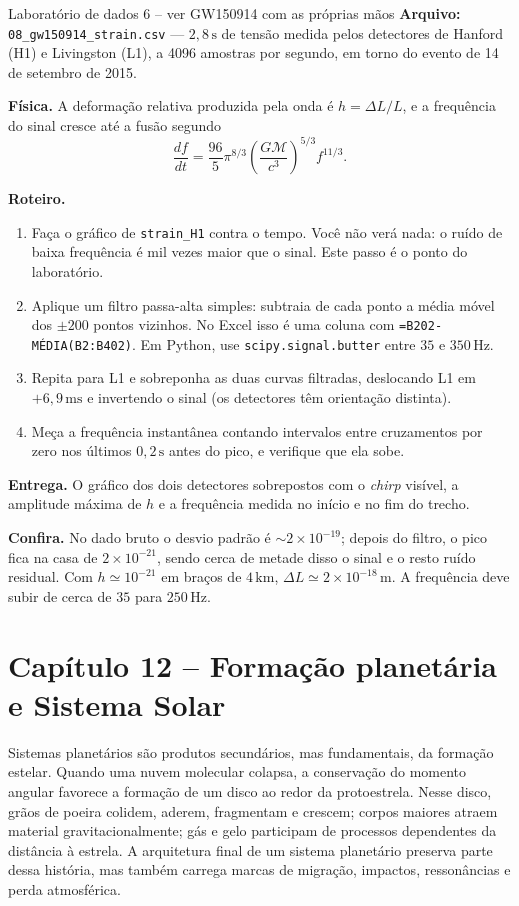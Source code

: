 \documentclass[11pt,a4paper]{article}
\begin{document}
\begin{lessonblock}[borderline west={2pt}{0pt}{astroGold}]{Laboratório de dados 6 -- ver GW150914 com as próprias mãos}
\textbf{Arquivo:} \texttt{08\_gw150914\_strain.csv} --- $2{,}8\,\mathrm{s}$ de tensão medida pelos detectores de Hanford (H1) e Livingston (L1), a 4096 amostras por segundo, em torno do evento de 14 de setembro de 2015.

\textbf{Física.} A deformação relativa produzida pela onda é $h=\Delta L/L$, e a frequência do sinal cresce até a fusão segundo
\[
\frac{df}{dt}=\frac{96}{5}\pi^{8/3}\left(\frac{G\mathcal{M}}{c^{3}}\right)^{5/3}f^{11/3}.
\]

\textbf{Roteiro.}
\begin{enumerate}
\item Faça o gráfico de \texttt{strain\_H1} contra o tempo. Você não verá nada: o ruído de baixa frequência é mil vezes maior que o sinal. Este passo é o ponto do laboratório.
\item Aplique um filtro passa-alta simples: subtraia de cada ponto a média móvel dos $\pm200$ pontos vizinhos. No Excel isso é uma coluna com \texttt{=B202-MÉDIA(B2:B402)}. Em Python, use \texttt{scipy.signal.butter} entre $35$ e $350\,\mathrm{Hz}$.
\item Repita para L1 e sobreponha as duas curvas filtradas, deslocando L1 em $+6{,}9\,\mathrm{ms}$ e invertendo o sinal (os detectores têm orientação distinta).
\item Meça a frequência instantânea contando intervalos entre cruzamentos por zero nos últimos $0{,}2\,\mathrm{s}$ antes do pico, e verifique que ela sobe.
\end{enumerate}

\textbf{Entrega.} O gráfico dos dois detectores sobrepostos com o \textit{chirp} visível, a amplitude máxima de $h$ e a frequência medida no início e no fim do trecho.

\textbf{Confira.} No dado bruto o desvio padrão é $\sim2\times10^{-19}$; depois do filtro, o pico fica na casa de $2\times10^{-21}$, sendo cerca de metade disso o sinal e o resto ruído residual. Com $h\simeq10^{-21}$ em braços de $4\,\mathrm{km}$, $\Delta L\simeq2\times10^{-18}\,\mathrm{m}$. A frequência deve subir de cerca de $35$ para $250\,\mathrm{Hz}$.
\end{lessonblock}

\newpage
\section*{Capítulo 12 -- Formação planetária e Sistema Solar}
Sistemas planetários são produtos secundários, mas fundamentais, da formação estelar. Quando uma nuvem molecular colapsa, a conservação do momento angular favorece a formação de um disco ao redor da protoestrela. Nesse disco, grãos de poeira colidem, aderem, fragmentam e crescem; corpos maiores atraem material gravitacionalmente; gás e gelo participam de processos dependentes da distância à estrela. A arquitetura final de um sistema planetário preserva parte dessa história, mas também carrega marcas de migração, impactos, ressonâncias e perda atmosférica.
\end{document}
